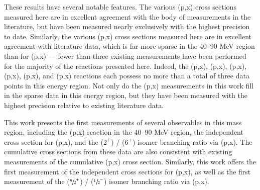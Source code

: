 \documentclass[3p]{elsarticle}
\begin{document}
These results have several notable features.
The various (p,x) cross sections measured here are in excellent agreement with the body of measurements in the literature,  but have been measured nearly exclusively with the highest precision to date.
Similarly, the various (p,x) cross sections measured here are in excellent agreement with literature data, which is far more sparse in the 40--90 MeV region than for (p,x) ---  fewer than three existing measurements have been performed for the majority of the reactions presented here.
Indeed,  the (p,x), (p,x), (p,x), (p,x), (p,x), and (p,x) reactions each possess no more than a total of three data points in this energy region.
Not only do the (p,x) measurements in this work fill in the sparse data in this energy region, but they have been measured with the highest precision relative to existing literature data.



This work presents the first measurements of several observables in 
this mass region, including the (p,x) reaction in the 40--90 MeV region, 
the independent cross section for       (p,x), and the  ($2^+$) /   ($6^+$)  isomer branching ratio via (p,x).  
The cumulative cross sections from these data are also consistent with existing measurements of the cumulative (p,x) cross section.
Similarly, this work offers the first measurement of the independent cross sections for (p,x),  as well as the first measurement of the      ($\sfrac{9}{2}^+$) /   ($\sfrac{1}{2}^-$) isomer branching ratio via (p,x).
\end{document}
